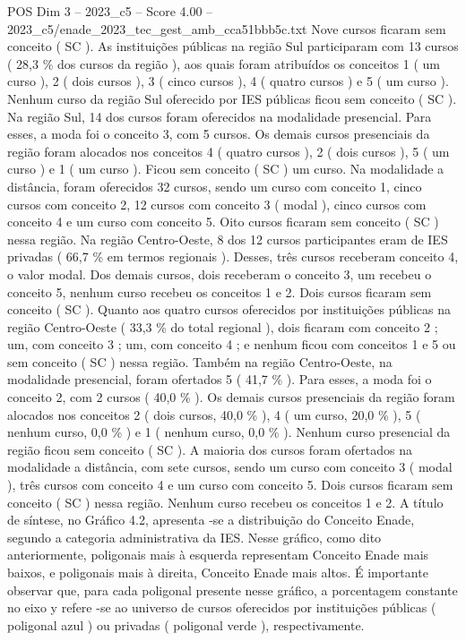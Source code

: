 \begin{textsample}{POS Dim 3 – 2023\_c5 – Score 4.00 – 2023\_c5/enade\_2023\_tec\_gest\_amb\_cca51bbb5c.txt}
Nove cursos ficaram sem conceito ( SC ).
As instituições públicas na região Sul participaram com 13 cursos ( 28,3 \% dos cursos da região ), aos quais foram atribuídos os conceitos 1 ( um curso ), 2 ( dois cursos ), 3 ( cinco cursos ), 4 ( quatro cursos ) e 5 ( um curso ).
Nenhum curso da região Sul oferecido por IES públicas ficou sem conceito ( SC ).
Na região Sul, 14 dos cursos foram oferecidos na modalidade presencial.
Para esses, a moda foi o conceito 3, com 5 cursos.
Os demais cursos presenciais da região foram alocados nos conceitos 4 ( quatro cursos ), 2 ( dois cursos ), 5 ( um curso ) e 1 ( um curso ).
Ficou sem conceito ( SC ) um curso.
Na modalidade a distância, foram oferecidos 32 cursos, sendo um curso com conceito 1, cinco cursos com conceito 2, 12 cursos com conceito 3 ( modal ), cinco cursos com conceito 4 e um curso com conceito 5.
Oito cursos ficaram sem conceito ( SC ) nessa região.
Na região Centro-Oeste, 8 dos 12 cursos participantes eram de IES privadas ( 66,7 \% em termos regionais ).
Desses, três cursos receberam conceito 4, o valor modal.
Dos demais cursos, dois receberam o conceito 3, um recebeu o conceito 5, nenhum curso recebeu os conceitos 1 e 2.
Dois cursos ficaram sem conceito ( SC ).
Quanto aos quatro cursos oferecidos por instituições públicas na região Centro-Oeste ( 33,3 \% do total regional ), dois ficaram com conceito 2 ; um, com conceito 3 ; um, com conceito 4 ; e nenhum ficou com conceitos 1 e 5 ou sem conceito ( SC ) nessa região.
Também na região Centro-Oeste, na modalidade presencial, foram ofertados 5 ( 41,7 \% ).
Para esses, a moda foi o conceito 2, com 2 cursos ( 40,0 \% ).
Os demais cursos presenciais da região foram alocados nos conceitos 2 ( dois cursos, 40,0 \% ), 4 ( um curso, 20,0 \% ), 5 ( nenhum curso, 0,0 \% ) e 1 ( nenhum curso, 0,0 \% ).
Nenhum curso presencial da região ficou sem conceito ( SC ).
A maioria dos cursos foram ofertados na modalidade a distância, com sete cursos, sendo um curso com conceito 3 ( modal ), três cursos com conceito 4 e um curso com conceito 5.
Dois cursos ficaram sem conceito ( SC ) nessa região.
Nenhum curso recebeu os conceitos 1 e 2.
A título de síntese, no Gráfico 4.2, apresenta -se a distribuição do Conceito Enade, segundo a categoria administrativa da IES.
Nesse gráfico, como dito anteriormente, poligonais mais à esquerda representam Conceito Enade mais baixos, e poligonais mais à direita, Conceito Enade mais altos.
É importante observar que, para cada poligonal presente nesse gráfico, a porcentagem constante no eixo y refere -se ao universo de cursos oferecidos por instituições públicas ( poligonal azul ) ou privadas ( poligonal verde ), respectivamente.

\end{textsample}
